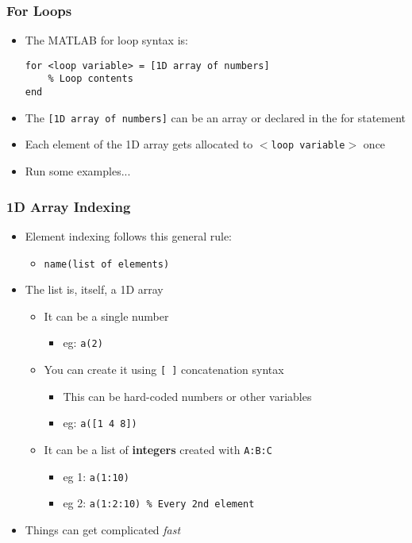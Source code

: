 \documentclass[14pt]{beamer}
\begin{document}
\begin{frame}[fragile]
\frametitle{For Loops}
\begin{itemize}
\item The MATLAB for loop syntax is:
\begin{lstlisting}[style=pseudo]
for <loop variable> = [1D array of numbers]
	% Loop contents
end
\end{lstlisting}
\item The \texttt{[1D array of numbers]} can be an array or declared in the for statement
\item Each element of the 1D array gets allocated to \texttt{$<$loop variable$>$} once
\item Run some examples...
\end{itemize}
\end{frame}

\begin{frame}
\frametitle{1D Array Indexing}
\begin{itemize}
\item Element indexing follows this general rule:
	\begin{itemize}
		\item \texttt{name(list of elements)}
	\end{itemize}
\item The list is, itself, a 1D array
	\begin{itemize}
		\item It can be a single number
			\begin{itemize}
				\item eg: \texttt{a(2)}
			\end{itemize}
		\item You can create it using \texttt{[ ]} concatenation syntax
		\begin{itemize}
			\item This can be hard-coded numbers or other variables
			\item eg: \texttt{a([1 4 8])}
		\end{itemize}
		\item It can be a list of \textbf{integers} created with \texttt{A:B:C}
			\begin{itemize}
				\item eg 1: \texttt{a(1:10)}
				\item eg 2: \texttt{a(1:2:10) \% Every 2nd element}
			\end{itemize}
	\end{itemize}
\item Things can get complicated \textit{fast}
\end{itemize}
\end{frame}
\end{document}
